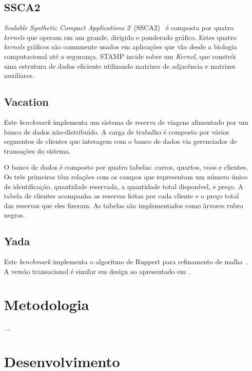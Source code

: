 \documentclass[diss,capa]{texufpel}
\begin{document}
\section{\textbf{SSCA2}}

\emph{Scalable Synthetic Compact Applications 2}~(SSCA2)~\cite{Bader05} é composta por quatro \emph{kernels} que operam em um grande, dirigido e ponderado gráfico. Estes quatro \emph{kernels} gráficos são comumente usados em aplicações que vão desde a biologia computacional até a segurança. STAMP incide sobre um \emph{Kernel}, que constrói uma estrutura de dados eficiente utilizando matrizes de adjacência e matrizes auxiliares.


\section{\textbf{Vacation}}

Este \emph{benchmark} implementa um sistema de reserva de viagens alimentado por um banco de dados não-distribuído. A carga de trabalho é composto por vários segmentos de clientes que interagem com o banco de dados via gerenciador de transações do sistema.

O banco de dados é composto por quatro tabelas: carros, quartos, voos e clientes. Os três primeiros têm relações com os campos que representam um número único de identificação, quantidade reservada, a quantidade total disponível, e preço. A tabela de clientes acompanha as reservas feitas por cada cliente e o preço total das reservas que eles fizeram. As tabelas são implementados como árvores rubro negras.


\section{\textbf{Yada}}

Este \emph{benchmark} implementa o algoritmo de Ruppert para refinamento de malha~\cite{Ruppert95}. A versão transacional é similar em design ao apresentado em~\cite{Kulkarni06}.

\chapter{Metodologia}

...

\chapter{Desenvolvimento}
\end{document}
